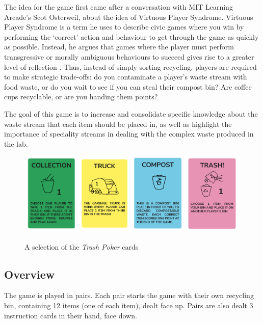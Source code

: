 \documentclass[nofonts,nols,justified,nobib]{tufte-book}
\begin{document}

The idea for the game first came after a conversation with MIT Learning Arcade's Scot Osterweil, about the idea of Virtuous Player Syndrome. Virtuous Player Syndrome is a term he uses to describe civic games where you win by performing the `correct' action and behaviour to get through the game as quickly as possible. Instead, he argues that games where the player must perform transgressive or morally ambiguous behaviours to succeed gives rise to a greater level of reflection \cite{osterweil_civic_2011}. Thus, instead of simply sorting recycling, players are required to make strategic trade-offs: do you contaminate a player's waste stream with food waste, or do you wait to see if you can steal their compost bin? Are coffee cups recyclable, or are you handing them points?

The goal of this game is to increase and consolidate specific knowledge about the waste stream that each item should be placed in, as well as highlight the importance of speciality streams in dealing with the complex waste produced in the lab.

\begin{figure}
  \caption{A selection of the \emph{Trash Poker} cards}
  \includegraphics[width=1\linewidth]{img/3/trashpoker.png}
  \label{contamination}
\end{figure}

\subsection*{Overview}

The game is played in pairs. Each pair starts the game with their own recycling bin, containing 12 items (one of each item), dealt face up. Pairs are also dealt 3 instruction cards in their hand, face down. 
\end{document}
